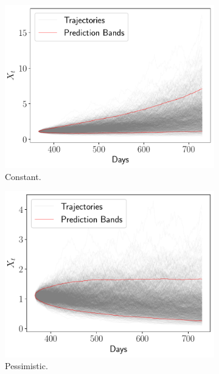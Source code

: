 \documentclass[11pt]{article}
\theoremstyle{definition}
\theoremstyle{remark}
\theoremstyle{remark}
\begin{document}
\begin{figure}[t]
  \centering
  \begin{subfigure}[b]{0.45\textwidth}
      \centering
      \includegraphics[scale=0.45]{bands_constant.pdf}
      \caption{Constant.}
  \end{subfigure}
  \begin{subfigure}[b]{0.45\textwidth}
      \centering
      \includegraphics[scale=0.45]{bands_pessimistic.pdf}
      \caption{Pessimistic.}
  \end{subfigure}
  \begin{subfigure}[b]{0.45\textwidth}
      \centering

\end{subfigure}
\end{figure}
\end{document}
